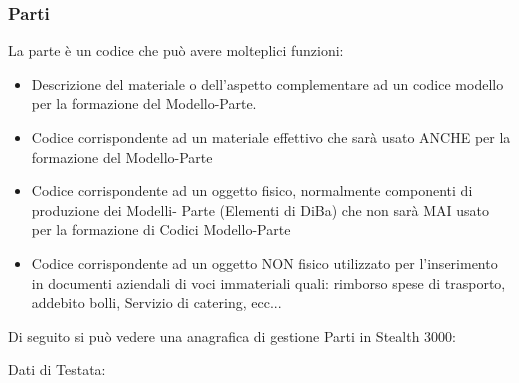 \subsubsection{Parti}
La parte è un codice che può avere molteplici funzioni:
\begin{itemize}
\item Descrizione del materiale o dell’aspetto complementare ad un codice modello per la formazione del Modello-Parte.

\item Codice corrispondente ad un materiale effettivo che sarà usato ANCHE per la formazione del Modello-Parte

\item Codice corrispondente ad un oggetto fisico, normalmente componenti di produzione dei Modelli- Parte (Elementi di DiBa) che non sarà MAI usato per la formazione di Codici Modello-Parte

\item Codice corrispondente ad un oggetto NON fisico utilizzato per l’inserimento in documenti aziendali di voci immateriali quali: rimborso spese di trasporto, addebito bolli, Servizio di catering, ecc...
\end{itemize}

Di seguito si può vedere una anagrafica di gestione Parti in Stealth 3000:



Dati di Testata:

